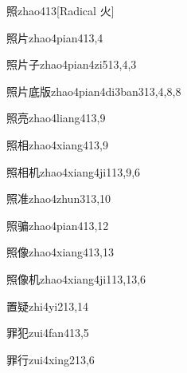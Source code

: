 \begin{verbete}{照}{zhao4}{13}[Radical 火]
\end{verbete}

\begin{verbete}{照片}{zhao4pian4}{13,4}
\end{verbete}

\begin{verbete}{照片子}{zhao4pian4zi5}{13,4,3}
\end{verbete}

\begin{verbete}{照片底版}{zhao4pian4di3ban3}{13,4,8,8}
\end{verbete}

\begin{verbete}{照亮}{zhao4liang4}{13,9}
\end{verbete}

\begin{verbete}{照相}{zhao4xiang4}{13,9}
\end{verbete}

\begin{verbete}{照相机}{zhao4xiang4ji1}{13,9,6}
\end{verbete}

\begin{verbete}{照准}{zhao4zhun3}{13,10}
\end{verbete}

\begin{verbete}{照骗}{zhao4pian4}{13,12}
\end{verbete}

\begin{verbete}{照像}{zhao4xiang4}{13,13}
\end{verbete}

\begin{verbete}{照像机}{zhao4xiang4ji1}{13,13,6}
\end{verbete}

\begin{verbete}{置疑}{zhi4yi2}{13,14}
\end{verbete}

\begin{verbete}{罪犯}{zui4fan4}{13,5}
\end{verbete}

\begin{verbete}{罪行}{zui4xing2}{13,6}
\end{verbete}


